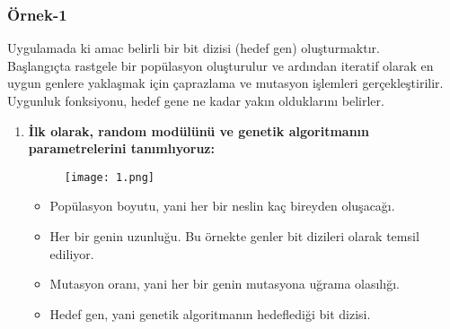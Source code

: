 \documentclass[12pt, a4paper]{article}
\begin{document}
\begin{flushleft}
	\subsubsection{Örnek-1}\cite{mıracöztürk}
	
	Uygulamada ki amac belirli bir bit dizisi (hedef gen) oluşturmaktır.\\
	Başlangıçta rastgele bir popülasyon oluşturulur ve ardından iteratif olarak en uygun genlere yaklaşmak için çaprazlama ve mutasyon işlemleri gerçekleştirilir.\\ Uygunluk fonksiyonu, hedef gene ne kadar yakın olduklarını belirler.\\[20pt]
	
	\begin{enumerate}
		
		
		\item \textbf {İlk olarak, random modülünü ve genetik algoritmanın parametrelerini tanımlıyoruz:}
		
		\begin{figure}[!h]
			\centering
			\texttt{[image: 1.png]}
			\\[20pt]
		\end{figure}
		\begin{itemize}
			\item Popülasyon boyutu, yani her bir neslin kaç bireyden oluşacağı.
			\item Her bir genin uzunluğu. Bu örnekte genler bit dizileri olarak temsil ediliyor.
			\item Mutasyon oranı, yani her bir genin mutasyona uğrama olasılığı.
			\item  Hedef gen, yani genetik algoritmanın hedeflediği bit dizisi.
			
			
			\clearpage
			
		\end{itemize}	
	

\end{enumerate}
\end{flushleft}
\end{document}
